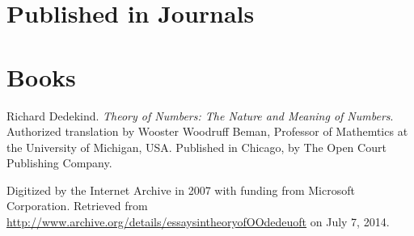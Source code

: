 \begin{thebibliography}{9} %

\section*{Published in Journals}








\section*{Books}


Richard Dedekind. \emph{Theory of Numbers: The Nature and Meaning of Numbers}.
Authorized translation by Wooster Woodruff Beman, Professor of Mathemtics at
the University of Michigan, USA. Published in Chicago, by The Open Court Publishing Company.

Digitized by the Internet Archive in 2007 with funding from Microsoft
Corporation. Retrieved from
\url{http://www.archive.org/details/essaysintheoryofOOdedeuoft} on July 7,
2014.

\backrefprint




\end{thebibliography}
